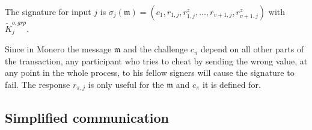 The signature for input $j$ is $\sigma_j(\mathfrak{m}) = (c_1,r_{1,j},r^{z}_{1,j},...,r_{v+1,j},r^{z}_{v+1,j})$ with $\tilde{K}^{o,grp}_j$.

Since in Monero the message $\mathfrak{m}$ and the challenge $c_{\pi}$ depend on all other parts of the transaction, any participant who tries to cheat by sending the wrong value, at any point in the whole process, to his fellow signers will cause the signature to fail. The response $r_{\pi,j}$ is only useful for the $\mathfrak{m}$ and $c_{\pi}$ it is defined for.


\subsection{Simplified communication}
\label{sec:simplified-communication}

